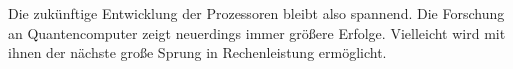 \documentclass[a4paper,12pt]{article}
\begin{document}
\par\bigskip\noindent Die zukünftige Entwicklung der Prozessoren bleibt also spannend. Die Forschung an Quantencomputer zeigt neuerdings immer größere Erfolge. Vielleicht wird mit ihnen der nächste große Sprung in Rechenleistung ermöglicht. 
\newpage
\pagestyle{empty}

\listoffigures
\newpage
{}
\listoftables
\newpage
{}
\listofcodes
\newpage
{}

\end{document}
